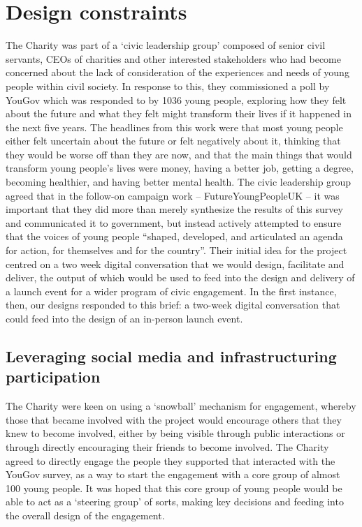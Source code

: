 \section{Design constraints}

The Charity was part of a ‘civic leadership group’ composed of senior civil servants, CEOs of charities and other interested stakeholders who had become concerned about the lack of consideration of the experiences and needs of young people within civil society. In response to this, they commissioned a poll by YouGov which was responded to by 1036 young people, exploring how they felt about the future and what they felt might transform their lives if it happened in the next five years. The headlines from this work were that most young people either felt uncertain about the future or felt negatively about it, thinking that they would be worse off than they are now, and that the main things that would transform young people’s lives were money, having a better job, getting a degree, becoming healthier, and having better mental health.  The civic leadership group agreed that in the follow-on campaign work – FutureYoungPeopleUK – it was important that they did more than merely synthesize the results of this survey and communicated it to government, but instead actively attempted to ensure that the voices of young people “shaped, developed, and articulated an agenda for action, for themselves and for the country”. Their initial idea for the project centred on a two week digital conversation that we would design, facilitate and deliver, the output of which would be used to feed into the design and delivery of a launch event for a wider program of civic engagement.  In the first instance, then, our designs responded to this brief: a two-week digital conversation that could feed into the design of an in-person launch event.

\subsection{Leveraging social media and infrastructuring participation}

The Charity were keen on using a ‘snowball’ mechanism for engagement, whereby those that became involved with the project would encourage others that they knew to become involved, either by being visible through public interactions or through directly encouraging their friends to become involved. The Charity agreed to directly engage the people they supported that interacted with the YouGov survey, as a way to start the engagement with a core group of almost 100 young people. It was hoped that this core group of young people would be able to act as a ‘steering group’ of sorts, making key decisions and feeding into the overall design of the engagement.

